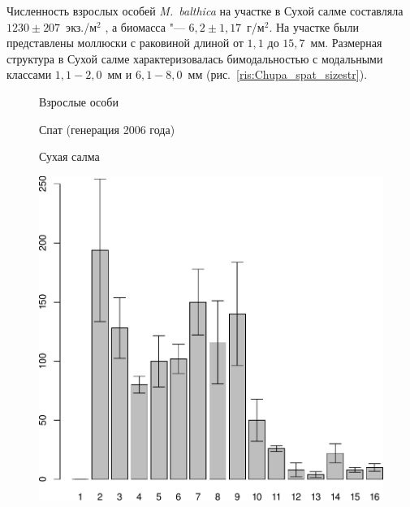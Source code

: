 Численность взрослых особей {\it M.~balthica} на участке в Сухой салме составляла $1230 \pm 207$~экз./м$^2$ , а биомасса "--- $6,2 \pm 1,17$~г/м$^2$. 
На участке были представлены моллюски с раковиной длиной от $1,1$ до $15,7$~мм. 
Размерная структура в Сухой салме характеризовалась бимодальностью с модальными классами $1,1 - 2,0$~мм и $6,1 - 8,0$~мм (рис.~\ref{ris:Chupa_spat_sizestr}). 
	\begin{figure}
	\begin{minipage}[b]{.46\linewidth}
	\begin{center}
	Взрослые особи
	\end{center}
	\end{minipage}
	\hfil %
	\begin{minipage}[b]{.46\linewidth}
	\begin{center}
	Спат (генерация 2006 года)
	\end{center}
	\end{minipage}
%
	\begin{minipage}[b]{\linewidth}
	\begin{center}
		Сухая салма
	\end{center}
	\end{minipage}
%
	\begin{minipage}[b]{.46\linewidth}
	\begin{center}
		\includegraphics[width=0.21\textheight]{../White_Sea/spat/adult_str_Suhaya_1.pdf}

\end{center}
\end{minipage}
\end{figure}
